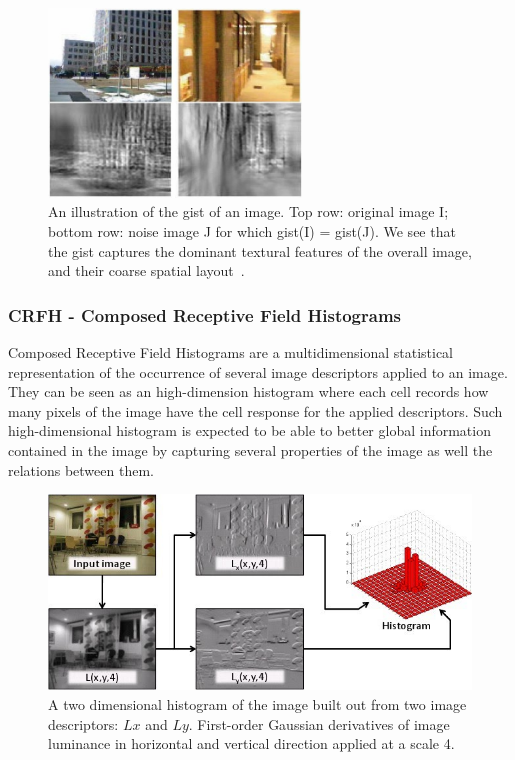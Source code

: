 \begin{figure}[h]
\center
\includegraphics[width=0.60\textwidth]{figures/gist.jpg}
\caption{An illustration of the gist of an image. Top row: original image I;
         bottom row: noise image J for which gist(I) = gist(J). We see that the
         gist captures the dominant textural features of the overall image, and
         their coarse spatial layout~\citep{murphy2006object}.}
\end{figure}


\subsubsection{{CRFH} - Composed Receptive Field Histograms}
\label{sec:crfh}\label{sec:global-features}
Composed Receptive Field Histograms are a multidimensional statistical
representation of the occurrence of several image descriptors applied to an
image. They can be seen as an high-dimension histogram where each cell records
how many pixels of the image have the cell response for the applied descriptors.
Such high-dimensional histogram is expected to be able to better global
information contained in the image by capturing several properties of the image
as well the relations between them.


\begin{figure}[h]
\begin{center}
\includegraphics[width=1\textwidth]{figures/crfh_model.jpg}
\end{center}
\caption{A two dimensional histogram of the image built out from two image
         descriptors: $Lx$ and $Ly$. First-order Gaussian derivatives of image
         luminance in horizontal and vertical direction applied at a scale 4.}
\end{figure}

